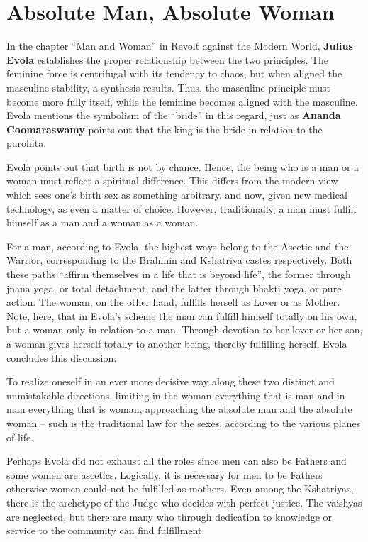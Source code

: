 \section{Absolute Man, Absolute Woman}

In the chapter “Man and Woman” in Revolt against the Modern World, \textbf{Julius Evola} establishes the proper relationship between the two principles. The feminine force is centrifugal with its tendency to chaos, but when aligned the masculine stability, a synthesis results. Thus, the masculine principle must become more fully itself, while the feminine becomes aligned with the masculine. Evola mentions the symbolism of the “bride” in this regard, just as \textbf{Ananda Coomaraswamy} points out that the king is the bride in relation to the purohita.

Evola points out that birth is not by chance. Hence, the being who is a man or a woman must reflect a spiritual difference. This differs from the modern view which sees one's birth sex as something arbitrary, and now, given new medical technology, as even a matter of choice. However, traditionally, a man must fulfill himself as a man and a woman as a woman.

For a man, according to Evola, the highest ways belong to the Ascetic and the Warrior, corresponding to the Brahmin and Kshatriya castes respectively. Both these paths “affirm themselves in a life that is beyond life”, the former through jnana yoga, or total detachment, and the latter through bhakti yoga, or pure action. The woman, on the other hand, fulfills herself as Lover or as Mother. Note, here, that in Evola's scheme the man can fulfill himself totally on his own, but a woman only in relation to a man. Through devotion to her lover or her son, a woman gives herself totally to another being, thereby fulfilling herself. Evola concludes this discussion:

\begin{quotex}
To realize oneself in an ever more decisive way along these two distinct and unmistakable directions, limiting in the woman everything that is man and in man everything that is woman, approaching the absolute man and the absolute woman – such is the traditional law for the sexes, according to the various planes of life. 

\end{quotex}
Perhaps Evola did not exhaust all the roles since men can also be Fathers and some women are ascetics. Logically, it is necessary for men to be Fathers otherwise women could not be fulfilled as mothers. Even among the Kshatriyas, there is the archetype of the Judge who decides with perfect justice. The vaishyas are neglected, but there are many who through dedication to knowledge or service to the community can find fulfillment.


